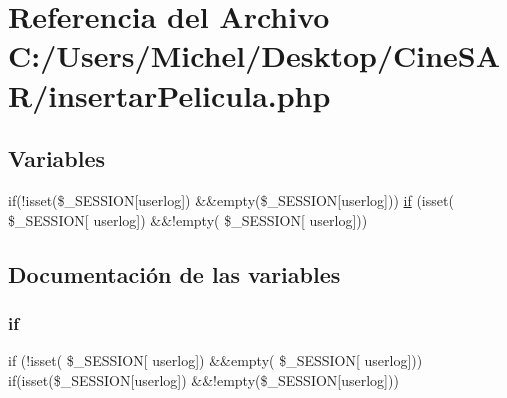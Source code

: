 \hypertarget{insertar_pelicula_8php}{}\section{Referencia del Archivo C\+:/\+Users/\+Michel/\+Desktop/\+Cine\+S\+A\+R/insertar\+Pelicula.php}
\label{insertar_pelicula_8php}
\subsection*{Variables}
\begin{DoxyCompactItemize}
\item 
if(!isset(\$\+\_\+\+S\+E\+S\+S\+I\+ON\mbox{[}\textquotesingle{}userlog\textquotesingle{}\mbox{]}) \&\&empty(\$\+\_\+\+S\+E\+S\+S\+I\+ON\mbox{[}\textquotesingle{}userlog\textquotesingle{}\mbox{]})) \mbox{\hyperlink{insertar_pelicula_8php_aa2baf0eb3a55cfb2103c03399175c1e4}{if}} (isset( \$\+\_\+\+S\+E\+S\+S\+I\+ON\mbox{[} \textquotesingle{}userlog\textquotesingle{}\mbox{]}) \&\&!empty( \$\+\_\+\+S\+E\+S\+S\+I\+ON\mbox{[} \textquotesingle{}userlog\textquotesingle{}\mbox{]}))
\end{DoxyCompactItemize}


\subsection{Documentación de las variables}
\mbox{\label{insertar_pelicula_8php_aa2baf0eb3a55cfb2103c03399175c1e4}} 
\subsubsection{\texorpdfstring{if}{if}}
{\footnotesize\ttfamily if (!isset( \$\+\_\+\+S\+E\+S\+S\+I\+ON\mbox{[} \textquotesingle{}userlog\textquotesingle{}\mbox{]}) \&\&empty( \$\+\_\+\+S\+E\+S\+S\+I\+ON\mbox{[} \textquotesingle{}userlog\textquotesingle{}\mbox{]})) if(isset(\$\+\_\+\+S\+E\+S\+S\+I\+ON\mbox{[}\textquotesingle{}userlog\textquotesingle{}\mbox{]}) \&\&!empty(\$\+\_\+\+S\+E\+S\+S\+I\+ON\mbox{[}\textquotesingle{}userlog\textquotesingle{}\mbox{]}))}

